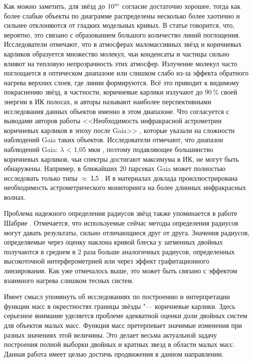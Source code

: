 Как можно заметить, для звёзд до \(\textup{10}^m\) согласие достаточно хорошее, тогда как более слабые объекты по диаграмме распределены несколько более хаотично и сильнее отклоняются от гладких модельных кривых. В статье говорится, что, вероятно, это связано с образованием большого количество линий поглощения. Исследователи отмечают, что в атмосферах маломассивных звёзд и коричневых карликов образуется множество молекул, чьи конденсаты и частицы сильно влияют на тепловую непрозрачность этих атмосфер. Излучение молекул часто поглощается в оптическом диапазоне или слишком слабо из-за эффекта обратного нагрева верхних слоев, где линии формируются. Всё это приводит к видимому покраснению звёзд, в частности, коричневые карлики излучают до 90\,\% своей энергии в ИК полосах, и авторы называют наиболее перспективными исследования данных объектов именно в этом диапазоне. Что согласуется с выводами авторов работы <<Необходимость инфракрасной астрометрии коричневых карликов в эпоху после Gaia>> , которые указали на сложности наблюдений Gaia таких объектов. Исследователи отмечают, что диапазон наблюдений Gaia: $\lambda$ < 1,05 мкм , поэтому подавляющее большинство коричневых карликов, чьи спектры достигают максимума в ИК, не могут быть обнаружены. Например, в ближайших 20 парсеках Gaia может полностью исследовать только типы $\approx$ L5 . И в материалах доклада проиллюстрирована необходимость астрометрического мониторинга на более длинных инфракрасных волнах.

Проблема надежного определения радиусов звёзд также упоминается в работе Шабрие . Отмечается, что используемые сейчас методы определения радиусов могут давать результаты, сильно отличающиеся друг от друга. Значения радиусов, определяемые через оценку наклона кривой блеска у затменных двойных получаются в среднем в 2 раза больше аналогичных радиусов, определенных высокоточной интерферометрией или через эффект графитационного линзирования. Как уже отмечалось выше, это может быть связано с эффектом взаимного нагрева слишком тесных систем.

Имеет смысл упомянуть об исследованиях по построению и интерпретации функции масс в окрестностях границы \glqq звёзды "--- коричневые карлики\grqq  {}. Здесь серьезное внимание уделяется проблеме адекватной оценки доли двойных систем для объектов малых масс. Функция масс претерпевает значимые изменения при разных значениях этой величины.  Это делает весьма актуальной задачу построения полной выборки двойных и кратных звезд в области малых масс. Данная работа имеет целью достичь продвижения в данном направлении.

